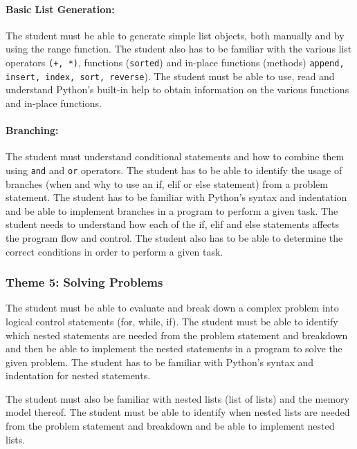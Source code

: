             \paragraph{Basic List Generation:}
                The student must be able to generate simple list objects, both
                manually and by using the range function. The student also has
                to be familiar with the various list operators \texttt{(+, *)},
                functions (\texttt{sorted}) and in-place functions (methods)
                \texttt{append, insert, index, sort, reverse}). The student
                must be able to use, read and understand Python's built-in help
                to obtain information on the various functions and in-place
                functions.

            \paragraph{Branching:}
                The student must understand conditional statements and how to
                combine them using \texttt{and} and \texttt{or} operators. The
                student has to be able to identify the usage of branches (when
                and why to use an if, elif or else statement) from a problem
                statement. The student has to be familiar with Python's syntax
                and indentation and be able to implement branches in a program
                to perform a given task. The student needs to understand how
                each of the if, elif and else statements affects the program
                flow and control. The student also has to be able to determine
                the correct conditions in order to perform a given task.

        \subsubsection{Theme 5: Solving Problems}
            The student must be able to evaluate and break down a complex
            problem into logical control statements (for, while, if). The
            student must be able to identify which nested statements are needed
            from the problem statement and breakdown and then be able to
            implement the nested statements in a program to solve the given
            problem. The student has to be familiar with Python's syntax and
            indentation for nested statements.

            The student must also be familiar with nested lists (list of lists)
            and the memory model thereof. The student must be able to identify
            when nested lists are needed from the problem statement and
            breakdown and be able to implement nested lists.

